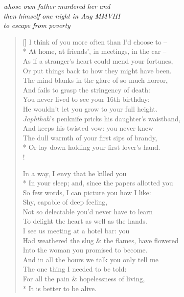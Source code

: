 \begin{center}
    \textit{whose own father murdered her and}\\
    \textit{then himself one night in Aug MMVIII}\\
    \textit{to escape from poverty}
\end{center}

\bigskip

\settowidth{\versewidth}{I think of you more often than I'd choose to --}
\begin{verse}[\versewidth]
    I think of you more often than I'd choose to --\\*
    At home, at friends', in meetings, in the car --\\
    As if a stranger's heart could mend your fortunes,\\
    Or put things back to how they might have been.\\
    The mind blanks in the glare of so much horror,\\
    And fails to grasp the stringency of death:\\
    You never lived to see your 16th birthday;\\
    He wouldn't let you grow to your full height.\\
    \textit{Japhthah}'s penknife pricks his daughter's waistband,\\
    And keeps his twisted vow: you never knew\\
    The dull warmth of your first sips of brandy,\\*
    Or lay down holding your first lover's hand.\\!

    In a way, I envy that he killed you\\*
    In your sleep; and, since the papers allotted you\\
    So few words, I can picture you how I like:\\
    Shy, capable of deep feeling,\\
    Not so delectable you'd never have to learn\\
    To delight the heart as well as the hands.\\
    I see us meeting at a hotel bar: you\\
    Had weathered the slug \& the flames, have flowered\\
    Into the woman you promised to become.\\
    And in all the hours we talk you only tell me\\
    The one thing I needed to be told:\\
    For all the pain \& hopelessness of living,\\*
    It is better to be alive.
\end{verse}
